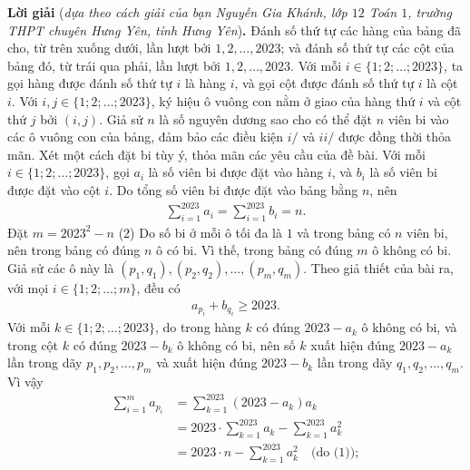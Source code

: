 \begin{multicols}{2}
	\vskip 0.05cm
	\textbf{\color{thachthuctoanhoc}Lời giải} (\textit{dựa theo cách giải của bạn Nguyễn Gia Khánh, lớp $12$ Toán $1$, trường THPT chuyên Hưng Yên, tỉnh Hưng Yên})\textbf{\color{thachthuctoanhoc}.}
	\vskip 0.05cm
	Đánh số thứ tự các hàng của bảng đã cho, từ trên xuống dưới, lần lượt bởi $1, 2, \ldots, 2023$; và đánh số thứ tự các cột của bảng đó, từ trái qua phải, lần lượt bởi $1, 2, \ldots, 2023$.
	\vskip 0.05cm
	Với mỗi $i \in  \{1; 2; \ldots; 2023\}$, ta gọi hàng được đánh số thứ tự $i$ là hàng $i$, và gọi cột được đánh số thứ tự $i$ là cột $i$.
	\vskip 0.05cm
	Với $i, j \in \{1; 2; \ldots; 2023\}$, ký hiệu ô vuông con nằm ở giao của hàng thứ $i$ và cột thứ $j$ bởi $(i, j)$.
	\vskip 0.05cm
	Giả sử $n$ là số nguyên dương sao cho có thể đặt $n$ viên bi vào các ô vuông con của bảng, đảm bảo các điều kiện $i/$ và $ii/$ được đồng thời thỏa mãn.
	\vskip 0.05cm
	Xét một cách đặt bi tùy ý, thỏa mãn các yêu cầu của đề bài.
	\vskip 0.05cm
	Với mỗi $i \in \{1; 2; \ldots; 2023\}$, gọi $a_i$  là số viên bi được đặt vào hàng $i$, và  $b_i$ là số viên bi được đặt vào cột $i$.
	\vskip 0.05cm
	Do tổng số viên bi được đặt vào bảng bằng $n$, nên
	\begin{align*}
		\sum\limits_{i = 1}^{2023} {{a_i}}  = \sum\limits_{i = 1}^{2023} {{b_i}}  = n. \tag{$1$}
	\end{align*}
	Đặt $m = 2023^2 -n$ \hfill    ($2$)
	\vskip 0.05cm
	Do số bi ở mỗi ô tối đa là $1$ và trong bảng có $n$ viên bi, nên trong bảng có đúng $n$ ô có bi. Vì thế, trong bảng có đúng $m$ ô không có bi. Giả sử các ô này là $(p_1,q_1), (p_2,q_2), \ldots, (p_m,q_m)$.
	\vskip 0.05cm 
	Theo giả thiết của bài ra, với mọi $i \in \{1; 2; \ldots; m\}$, đều có
	\begin{align*}
		{a_{{p_i}}} + {b_{{q_i}}} \ge 2023. \tag{$3$}
	\end{align*}
	Với mỗi $k \in \{1; 2; \ldots; 2023\}$, do trong hàng $k$ có đúng $2023 - a_k$  ô không có bi, và trong cột $k$ có đúng $2023-b_k$  ô không có bi, nên số $k$ xuất hiện đúng $2023- a_k$  lần trong dãy $p_1,p_2,\ldots,p_m$  và xuất hiện đúng $2023-b_k$  lần trong dãy $q_1, q_2,\ldots,q_m$.
	\vskip 0.05cm 
	Vì vậy
	\begin{align*}
		\sum\limits_{i = 1}^m {{a_{{p_i}}}} & = \sum\limits_{k = 1}^{2023} {\left( {2023 - {a_k}} \right){a_k}} \\
		& = 2023 \cdot \sum\limits_{k = 1}^{2023} {{a_k}}  - \sum\limits_{k = 1}^{2023} {a_k^2}  \\
		&= 2023 \cdot n - \sum\limits_{k = 1}^{2023} {a_k^2} \quad\text{(do ($1$))}; \tag{$4$}\\

\end{align*}
\end{multicols}
